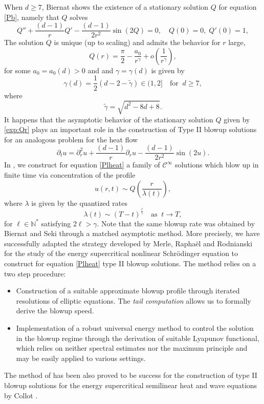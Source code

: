 \documentclass[11pt]{aims}
\theoremstyle{definition}
\numberwithin{equation}{section}
\begin{document}
When $d \geq 7$, Biernat \cite{BIEnon2015} shows the existence of a stationary solution $Q$ for equation \eqref{Pb}, namely that $Q$ solves
\begin{equation}\label{eq:Qr}
Q'' + \frac{(d-1)}{r}Q' - \frac{(d-1)}{2r^2}\sin(2Q) = 0, \quad Q(0) = 0, \; Q'(0) = 1,
\end{equation} 
The solution $Q$ is unique (up to scaling) and admits the behavior for $r$ large,
\begin{equation}\label{exp:Qr}
Q(r) = \dfrac{\pi}{2} - \dfrac{a_0}{ r^{\gamma}} + o\left(\dfrac 1{r^{\gamma}}\right),
\end{equation}
for some $a_0 = a_0(d) > 0$ and and $\gamma = \gamma(d)$ is given by
\begin{equation}\label{def:gamome}
\gamma(d) = \frac{1}{2}(d - 2 - \tilde{\gamma}) \in (1,2] \quad \text{for}\;\; d \geq 7,
\end{equation}
where 
$$\tilde{\gamma}=\sqrt{d^2-8d+8}.$$
It happens that the asymptotic behavior of the stationary solution $Q$ given by \eqref{exp:Qr} plays an important role in the construction of Type II blowup solutions for an analogous problem for the heat flow
\begin{equation}\label{Plheat}
{\partial_t} u = \partial^2_r u + \frac{(d-1)}{r}\partial_r u - \frac{(d-1)}{2r^2}\sin(2u).
\end{equation}
In \cite{IGN16}, we construct for equation \eqref{Plheat} a family of $\mathcal{C}^\infty$ solutions which blow up in finite time via concentration of the profile
$$u(r,t) \sim Q\left(\frac{r}{\lambda(t)}\right),$$
where $\lambda$ is given by the quantized rates 
$$\lambda(t) \sim (T-t)^\frac{\ell}{\gamma} \quad \text{as}\;\; t \to T,$$
for $\ell \in \mathbb{N}^*$ satisfying $2\ell > \gamma$. Note that the same blowup rate was obtained by Biernat and Seki \cite{BSarxiv2016} through a matched asymptotic method. More precisely, we have successfully adapted the strategy developed by Merle, Rapha\"el and Rodnianski \cite{MRRcjm15} for the study of the energy supercritical nonlinear Schr\"odinger equation to construct for equation \eqref{Plheat} type II blowup solutions. The method relies on a two step procedure:
\begin{itemize}
\item Construction of a suitable approximate blowup profile through iterated resolutions of elliptic equations. The \textit{tail computation} allows us to formally derive the blowup speed. 

\item Implementation of a robust universal energy method to control the solution in the blowup regime through the derivation of suitable Lyapunov functional, which relies on neither spectral estimates nor the maximum principle and may be easily applied to various settings.
\end{itemize}
The method of \cite{MRRcjm15} has been also proved to be success for the construction of type II blowup solutions for the energy supercritical semilinear heat and wave equations by Collot \cite{Car16, Car161}. 
\end{document}
